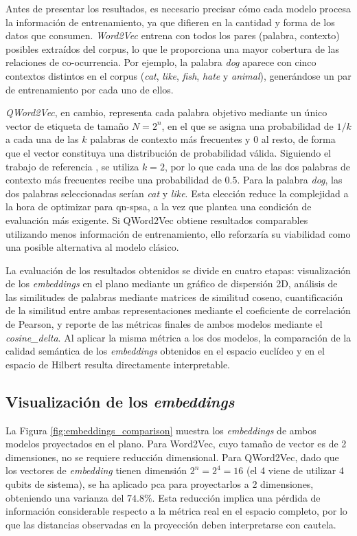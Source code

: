 Antes de presentar los resultados, es necesario precisar cómo cada modelo procesa la información de entrenamiento, ya que difieren en la cantidad y forma de los datos que consumen. \textit{Word2Vec} entrena con todos los pares (palabra, contexto) posibles extraídos del corpus, lo que le proporciona una mayor cobertura de las relaciones de co-ocurrencia. Por ejemplo, la palabra \textit{dog} aparece con cinco contextos distintos en el corpus (\textit{cat}, \textit{like}, \textit{fish}, \textit{hate} y \textit{animal}), generándose un par de entrenamiento por cada uno de ellos.

\textit{QWord2Vec}, en cambio, representa cada palabra objetivo mediante un único vector de etiqueta de tamaño $N = 2^n$, en el que se asigna una probabilidad de $1/k$ a cada una de las $k$ palabras de contexto más frecuentes y $0$ al resto, de forma que el vector constituya una distribución de probabilidad válida. Siguiendo el trabajo de referencia \cite{ohno_qword2vec_2025}, se utiliza $k = 2$, por lo que cada una de las dos palabras de contexto más frecuentes recibe una probabilidad de $0.5$. Para la palabra \textit{dog}, las dos palabras seleccionadas serían \textit{cat} y \textit{like}. Esta elección reduce la complejidad a la hora de optimizar para \gls{qn-spsa}, a la vez que plantea una condición de evaluación más exigente. Si QWord2Vec obtiene resultados comparables utilizando menos información de entrenamiento, ello reforzaría su viabilidad como una posible alternativa al modelo clásico.

La evaluación de los resultados obtenidos se divide en cuatro etapas: visualización de los \textit{embeddings} en el plano mediante un gráfico de dispersión 2D, análisis de las similitudes de palabras mediante matrices de similitud coseno, cuantificación de la similitud entre ambas representaciones mediante el coeficiente de correlación de Pearson, y reporte de las métricas finales de ambos modelos mediante el \textit{cosine\_delta}. Al aplicar la misma métrica a los dos modelos, la comparación de la calidad semántica de los \textit{embeddings} obtenidos en el espacio euclídeo y en el espacio de Hilbert resulta directamente interpretable.

\subsection{Visualización de los \textit{embeddings}}

La Figura \ref{fig:embeddings_comparison} muestra los \textit{embeddings} de ambos modelos proyectados en el plano. Para Word2Vec, cuyo tamaño de vector es de 2 dimensiones, no se requiere reducción dimensional. Para QWord2Vec, dado que los vectores de \textit{embedding} tienen dimensión $2^n = 2^4 = 16$ (el 4 viene de utilizar 4 qubits de sistema), se ha aplicado \gls{pca} para proyectarlos a 2 dimensiones, obteniendo una varianza del $74.8\%$. Esta reducción implica una pérdida de información considerable respecto a la métrica real en el espacio completo, por lo que las distancias observadas en la proyección deben interpretarse con cautela.

